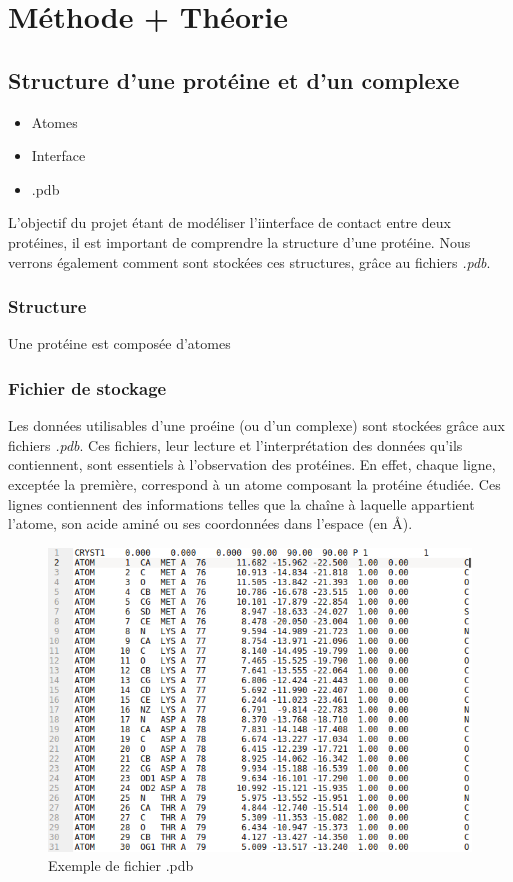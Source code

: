 \chapter{Méthode + Théorie}

\section{Structure d'une protéine et d'un complexe}
\begin{itemize}
  \item Atomes
  \item Interface
  \item .pdb
\end{itemize}
\cite{Proteine}

L'objectif du projet étant de modéliser l'iinterface de contact entre deux protéines,
il est important de comprendre la structure d'une protéine. Nous verrons également
comment sont stockées ces structures, grâce au fichiers \textit{.pdb}.

\subsection{Structure}

Une protéine est composée d'atomes

\subsection{Fichier de stockage}

Les données utilisables d'une proéine (ou d'un complexe) sont stockées grâce aux
fichiers \textit{.pdb}. Ces fichiers, leur lecture et l'interprétation des données
qu'ils contiennent, sont essentiels à l'observation des protéines. En effet, chaque
ligne, exceptée la première, correspond à un atome composant la protéine étudiée.
Ces lignes contiennent des informations telles que la chaîne à laquelle appartient
l'atome, son acide aminé ou ses coordonnées dans l'espace (en $\si{\angstrom}$).   

\begin{figure}[ht]
  \includegraphics[width=\textwidth]{figures/pdb_example.png}
  \caption{Exemple de fichier .pdb}
  \label{fig::pdb_file}
\end{figure}

